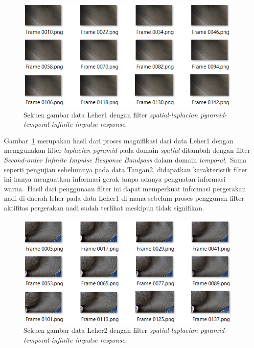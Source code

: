 \begin{figure}[ht]
	\vspace{0.5em}
	\centering
	\includegraphics[width=\textwidth]{data-leher1}
	\caption{Sekuen gambar data Leher1 dengan filter \textit{spatial-laplacian pyramid-temporal-infinite impulse response}.}
	\label{fig:sekuen-leher1}   
\end{figure}
Gambar~\ref{fig:sekuen-leher1} merupakan hasil dari proses magnifikasi dari data Leher1 dengan menggunakan filter \textit{laplacian pyramid} pada domain \textit{spatial} ditambah dengan filter \textit{Second-order Infinite Impulse Response Bandpass} dalam domain \textit{temporal}.~Sama seperti pengujian sebelumnya pada data Tangan2, didapatkan karakteristik filter ini hanya menguatkan informasi gerak tanpa adanya penguatan informasi warna.~Hasil dari penggunaan filter ini dapat memperkuat informasi pergerakan nadi di daerah leher pada data Leher1 di mana sebelum proses penggunan filter aktifitas pergerakan nadi sudah terlihat meskipun tidak signifikan.
\newpage
\begin{figure}[ht]
	\vspace{0.5em}
	\centering
	\includegraphics[width=\textwidth]{data-leher2}
	\caption{Sekuen gambar data Leher2 dengan filter \textit{spatial-laplacian pyramid-temporal-infinite impulse response}.}
	\label{fig:sekuen-leher2}   
\end{figure}


